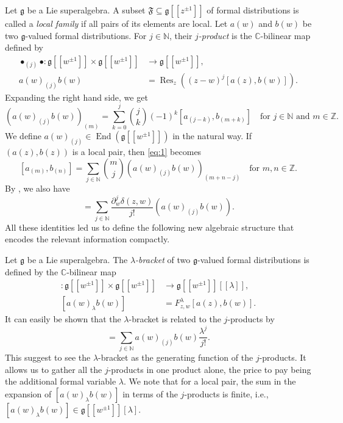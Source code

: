 \documentclass[a4paper, 12pt, reqno]{amsart}
\theoremstyle{remark}
\numberwithin{equation}{subsection}
\DeclareMathOperator{\End}{End}
\DeclareMathOperator{\Res}{Res}
\begin{document}
Let $\mathfrak{g}$ be a Lie superalgebra.
A subset $\mathfrak{F} \subseteq \mathfrak{g}[[z^{\pm 1}]]$ of formal distributions is called a \emph{local family} if all pairs of its elements are local.
Let $a(w)$ and $b(w)$ be two $\mathfrak{g}$-valued formal distributions.
For $j \in \mathbb{N}$, their \emph{$j$-product} is the $\mathbb{C}$-bilinear map defined by
\begin{align}
  \nonumber
  \bullet_{(j)}\bullet: \mathfrak{g}[[w^{\pm 1}]] \times \mathfrak{g}[[w^{\pm 1}]] &\to \mathfrak{g}[[w^{\pm 1}]], \\
  \label{eq:2}
  a(w)_{(j)}b(w) &= \Res_z((z - w)^j[a(z), b(w)]).
\end{align}
Expanding the right hand side, we get
\begin{equation}
  \label{eq:3}
  (a(w)_{(j)}b(w))_{(m)} = \sum_{k = 0}^j\binom{j}{k}(-1)^k[a_{(j - k)},b_{(m + k)}] \quad \text{for }j \in \mathbb{N}\text{ and }m \in \mathbb{Z}.
\end{equation}
We define $a(w)_{(j)} \in \End(\mathfrak{g}[[w^{\pm 1}]])$ in the natural way.
If $(a(z), b(z))$ is a local pair, then \eqref{eq:1} becomes
\begin{equation}
  \label{eq:4}
  [a_{(m)}, b_{(n)}] = \sum_{j \in \mathbb{N}}\binom{m}{j}(a(w)_{(j)}b(w))_{(m + n - j)} \quad \text{for }m, n \in \mathbb{Z}.
\end{equation}
By , we also have
\begin{equation*}
  [a(z), b(w)] = \sum_{j \in \mathbb{N}}\frac{\partial_w^j\delta(z, w)}{j!}(a(w)_{(j)}b(w)).
\end{equation*}
All these identities led us to define the following new algebraic structure that encodes the relevant information compactly.

Let $\mathfrak{g}$ be a Lie superalgebra.
The \emph{$\lambda$-bracket} of two $\mathfrak{g}$-valued formal distributions is defined by the $\mathbb{C}$-bilinear map
\begin{align*}
  [\bullet_{\lambda}\bullet]: \mathfrak{g}[[w^{\pm 1}]] \times \mathfrak{g}[[w^{\pm 1}]] &\to \mathfrak{g}[[w^{\pm 1}]][[\lambda]], \\
  [a(w)_{\lambda}b(w)] &= F^{\lambda}_{z, w}[a(z), b(w)].
\end{align*}
It can easily be shown that the $\lambda$-bracket is related to the $j$-products by
\begin{equation*}
  [a(w)_{\lambda}b(w)] = \sum_{j \in \mathbb{N}}a(w)_{(j)}b(w)\frac{\lambda^j}{j!}.
\end{equation*}
This suggest to see the $\lambda$-bracket as the generating function of the $j$-products.
It allows us to gather all the $j$-products in one product alone, the price to pay being the additional formal variable $\lambda$.
We note that for a local pair, the sum in the expansion of $[a(w)_{\lambda} b(w)]$ in terms of the $j$-products is finite, i.e., $[a(w)_{\lambda}b(w)] \in \mathfrak{g}[[w^{\pm 1}]][\lambda]$.
\end{document}

